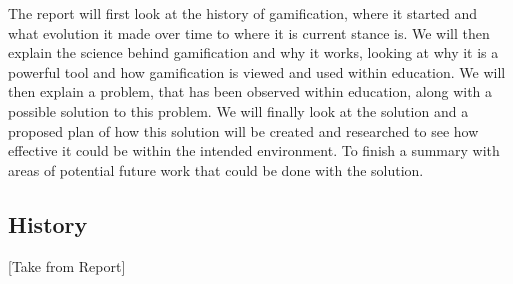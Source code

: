 \documentclass{sigchi}
\begin{document}
The report will first look at the history of gamification, where it started and what evolution it made over time to where it is current stance is. We will then explain the science behind gamification and why it works, looking at why it is a powerful tool and how gamification is viewed and used within education. We will then explain a problem, that has been observed within education, along with a possible solution to this problem. We will finally look at the solution and a proposed plan of how this solution will be created and researched to see how effective it could be within the intended environment. To finish a summary with areas of potential future work that could be done with the solution.

\subsection{History}
[Take from Report]\\
\end{document}
